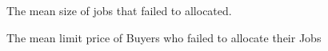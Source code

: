 \begin{figure}[h] 
  \centering
  \caption{The mean size of jobs that failed to allocated.}
  \label{FIG:RES:FAILEDSIZES}
\end{figure}

\begin{figure}[h] 
  \centering
  \caption{The mean limit price of Buyers who failed to allocate their Jobs}
  \label{FIG:RES:FAILEDLIMITS}
\end{figure}

